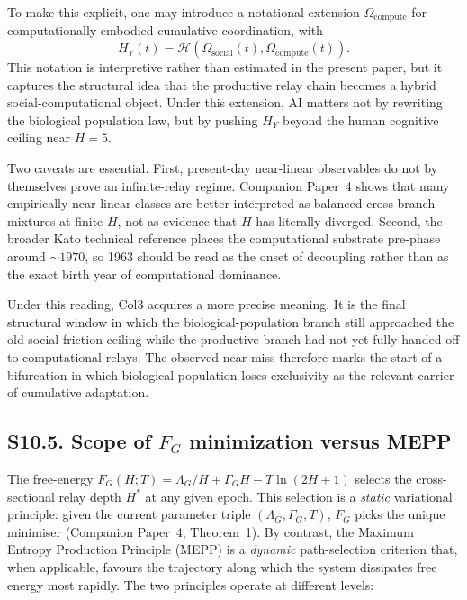 \documentclass[11pt]{article}
\begin{document}
To make this explicit, one may introduce a notational extension
$\Omega_{\mathrm{compute}}$ for computationally embodied cumulative
coordination, with
\[
H_Y(t)=\mathcal{H}\!\left(\Omega_{\mathrm{social}}(t),
\Omega_{\mathrm{compute}}(t)\right).
\]
This notation is interpretive rather than estimated in the present paper, but
it captures the structural idea that the productive relay chain becomes a
hybrid social-computational object. Under this extension, AI matters not by
rewriting the biological population law, but by pushing $H_Y$ beyond the
human cognitive ceiling near $H=5$.

Two caveats are essential. First, present-day near-linear observables do not by
themselves prove an infinite-relay regime. Companion Paper~4 shows that many
empirically near-linear classes are better interpreted as balanced cross-branch
mixtures at finite $H$, not as evidence that $H$ has literally diverged.
Second, the broader Kato technical reference places the computational
substrate pre-phase around ${\sim}1970$, so 1963 should be read as the onset
of decoupling rather than as the exact birth year of computational dominance.

Under this reading, Col3 acquires a more precise meaning. It is the final
structural window in which the biological-population branch still approached
the old social-friction ceiling while the productive branch had not yet fully
handed off to computational relays. The observed near-miss therefore marks the
start of a bifurcation in which biological population loses exclusivity as the
relevant carrier of cumulative adaptation.


\subsection*{S10.5. Scope of $F_G$ minimization versus MEPP}

The free-energy $F_G(H;T)=\Lambda_G/H + \Gamma_G H - T\ln(2H+1)$ selects the
cross-sectional relay depth $H^*$ at any given epoch. This selection is a
\emph{static} variational principle: given the current parameter triple
$(\Lambda_G,\Gamma_G,T)$, $F_G$ picks the unique minimiser (Companion Paper~4,
Theorem~1). By contrast, the Maximum Entropy Production Principle (MEPP) is a
\emph{dynamic} path-selection criterion that, when applicable, favours the
trajectory along which the system dissipates free energy most rapidly. The two
principles operate at different levels:
\end{document}
